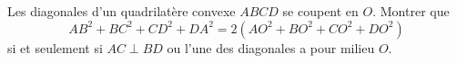 Les diagonales d'un quadrilatère convexe $ABCD$ se coupent en $O$. Montrer que
\[ AB^2 + BC^2 + CD^2 + DA^2 = 2\left(AO^2 + BO^2 + CO^2 + DO^2\right) \]
si et seulement si $AC \perp BD$ ou l'une des diagonales a pour milieu $O$.
